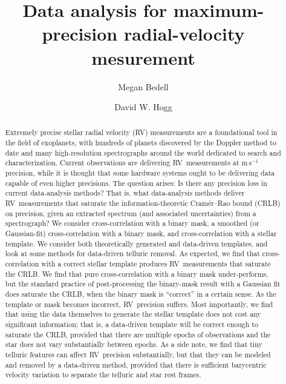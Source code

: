 \documentclass[modern]{aastex62}
\newcommand{\unit}[1]{\mathrm{#1}}
\newcommand{\m}{\unit{m}}
\newcommand{\s}{\unit{s}}
\newcommand{\ms}{\m\,\s^{-1}}
\newcommand{\acronym}[1]{{\small{#1}}}
\newcommand{\RV}{\acronym{RV}}
\newcommand{\CRLB}{\acronym{CRLB}}
\begin{document}
\sloppy\sloppypar\raggedbottom\frenchspacing %
\graphicspath{ {figures/} }

\title{\textbf{Data analysis for maximum-precision radial-velocity mesurement}}

\author[0000-0001-9907-7742]{Megan Bedell}

\author[0000-0003-2866-9403]{David W. Hogg}

\begin{abstract}\noindent
Extremely precise stellar radial velocity (\RV) measurements are a
foundational tool in the field of exoplanets, with hundreds of planets
discovered by the Doppler method to date and many high-resolution
spectrographs around the world dedicated to search and
characterization.
Current observations are delivering \RV\ measurements at $\ms$
precision, while it is thought that some hardware systems ought to be
delivering data capable of even higher precisions.
The question arises: Is there any precision loss in current
data-analysis methods?
That is, what data-analysis methods deliver \RV\ measurements that
saturate the information-theoretic 
Cram\'er--Rao bound (\CRLB) on precision, given an extracted spectrum (and
associated uncertainties) from a spectrograph?
We consider cross-correlation with a binary mask, a smoothed (or
Gaussian-fit) cross-correlation with a binary mask, and
cross-correlation with a stellar template.
We consider both theoretically generated and data-driven templates,
and look at some methods for data-driven telluric removal.
As expected, we find that cross-correlation with a correct stellar
template produces \RV\ measurements that saturate the \CRLB.
We find that pure cross-correlation with a binary mask under-performs,
but the standard practice of post-processing the binary-mask result
with a Gaussian fit does saturate the \CRLB, when the binary mask is
``correct'' in a certain sense.
As the template or mask becomes incorrect, \RV\ precision suffers.
Most importantly, we find that using the data themselves to generate
the stellar template does not cost any significant information; that
is, a data-driven template will be correct enough to saturate the
\CRLB, provided that there are multiple epochs of observations and the
star does not vary substantially between epochs.
As a side note, we find that tiny telluric features can affect \RV\ precision
substantially, but that they can be modeled and removed by a data-driven
method, provided that there is sufficient barycentric velocity variation to
separate the telluric and star rest frames.
\end{abstract}
\end{document}

